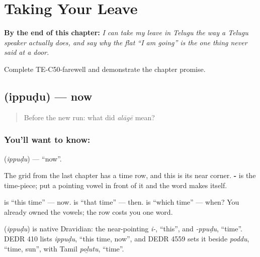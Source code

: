 
\chapter{Taking Your Leave}
\label{ch:te-leave-more}

\begin{chapteropening}
\textbf{By the end of this chapter:} \emph{I can take my leave in Telugu the way a Telugu speaker actually does, and say why the flat \textquotedblleft{}I am going\textquotedblright{} is the one thing never said at a door.}

Complete TE-C50-farewell and demonstrate the chapter promise.
\end{chapteropening}

\section[\texorpdfstring{\te{ఇప్పుడు} (ippuḍu)}{ఇప్పుడు (ippuḍu)}]{ (ippuḍu) — now}

\label{lesson:TE-C50-now}



\begin{quote}
Before the new run: what did \emph{alāgē} mean?
\end{quote}

\subsection*{You'll want to know: }
\textbf{} (\emph{ippuḍu}) — \textquotedblleft{}now\textquotedblright{}.

The grid from the last chapter has a time row, and this is its near corner. \textbf{-} is the time-piece; put a pointing vowel in front of it and the word makes itself.

 is \textquotedblleft{}this time\textquotedblright{} — now.  is \textquotedblleft{}that time\textquotedblright{} — then.  is \textquotedblleft{}which time\textquotedblright{} — when? You already owned the vowels; the row costs you one word.

\begin{cousinweb}
\textbf{} (\emph{ippuḍu}) is native Dravidian: the near-pointing \emph{i-}, \textquotedblleft{}this\textquotedblright{}, and \emph{-ppuḍu}, \textquotedblleft{}time\textquotedblright{}. DEDR 410 lists \emph{ippuḍu}, \textquotedblleft{}this time, now\textquotedblright{}, and DEDR 4559 sets it beside \emph{poddu}, \textquotedblleft{}time, sun\textquotedblright{}, with Tamil \emph{poḻutu}, \textquotedblleft{}time\textquotedblright{}.
\end{cousinweb}

